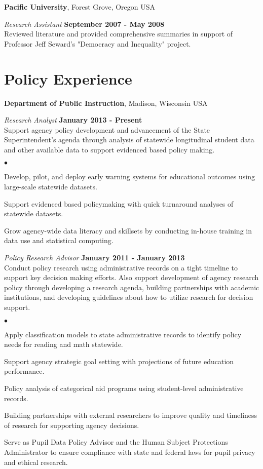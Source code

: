 \documentclass[margin,line]{res}
\newenvironment{list2}{
  \begin{list}{$\bullet$}{%
      \setlength{\itemsep}{0in}
      \setlength{\parsep}{0in} \setlength{\parskip}{0in}
      \setlength{\topsep}{0in} \setlength{\partopsep}{0in} 
      \setlength{\leftmargin}{0.2in}}}{\end{list}}
\begin{document}
\begin{resume}
{\bf Pacific University}, Forest Grove, Oregon USA

\vspace{-.3cm}
{\em Research Assistant} \hfill {\bf September 2007 - May 2008}\\
Reviewed literature and provided comprehensive summaries in support of Professor Jeff Seward's "Democracy and Inequality" project.


\section{\sc Policy Experience}
{\bf Department of Public Instruction}, Madison, Wisconsin USA

\vspace{-.3cm}
{\em Research Analyst} \hfill {\bf January 2013 - Present}\\
Support agency policy development and advancement of the State Superintendent's agenda through analysis of statewide longitudinal student data and other available data to support evidenced based policy making. 
\begin{list2}
\item Develop, pilot, and deploy early warning systems for educational outcomes using large-scale statewide datasets. 
\item Support evidenced based policymaking with quick turnaround analyses of statewide datasets. 
\item Grow agency-wide data literacy and skillsets by conducting in-house training in data use and statistical computing.
\end{list2}

\vspace{-.3cm}
{\em Policy Research Advisor} \hfill {\bf January 2011 - January 2013}\\
Conduct policy research using administrative records on a tight timeline to support key decision making efforts. Also support development of agency research policy through developing a research agenda, building partnerships with academic institutions, and developing guidelines about how to utilize research for decision support.
\begin{list2}
\item Apply classification models to state administrative records to identify policy needs for reading and math statewide.
\item Support agency strategic goal setting with projections of future education performance.
\item Policy analysis of categorical aid programs using student-level administrative records.
\item Building partnerships with external researchers to improve quality and timeliness of research for supporting agency decisions.
\item Serve as Pupil Data Policy Advisor and the Human Subject Protections Administrator to ensure compliance with state and federal laws for pupil privacy and ethical research.
\end{list2}


\end{resume}
\end{document}
